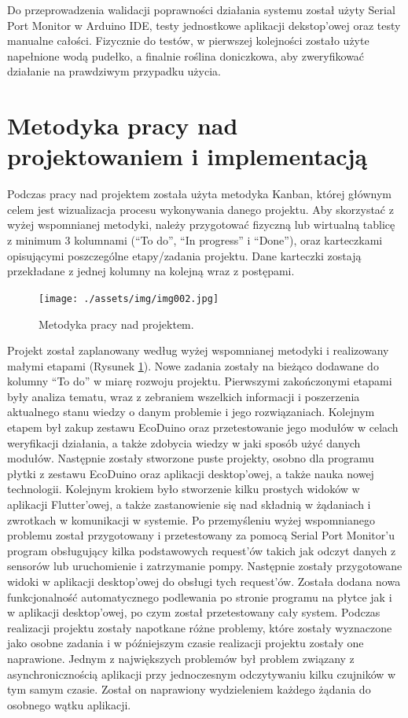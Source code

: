 \documentclass[a4paper,twoside,12pt]{book}
\begin{document}
Do przeprowadzenia walidacji poprawności działania systemu został użyty Serial Port Monitor w Arduino IDE, testy jednostkowe aplikacji dekstop'owej oraz testy manualne całości. Fizycznie do testów, w pierwszej kolejności zostało użyte napełnione wodą pudełko, a finalnie roślina doniczkowa, aby zweryfikować działanie na prawdziwym przypadku użycia.

\section{Metodyka pracy nad projektowaniem i implementacją}

Podczas pracy nad projektem została użyta metodyka Kanban, której głównym celem jest wizualizacja procesu wykonywania danego projektu. Aby skorzystać z wyżej wspomnianej metodyki, należy przygotować fizyczną lub wirtualną tablicę z minimum 3 kolumnami (``To do'', ``In progress'' i ``Done''), oraz karteczkami opisującymi poszczególne etapy/zadania projektu. Dane karteczki zostają przekładane z jednej kolumny na kolejną wraz z postępami.

\begin{figure}[H]
   \centering
   \texttt{[image: ./assets/img/img002.jpg]}
   \caption{Metodyka pracy nad projektem.}
   \label{fig:2}
\end{figure}

Projekt został zaplanowany według wyżej wspomnianej metodyki i realizowany małymi etapami (Rysunek \ref{fig:2}). Nowe zadania zostały na bieżąco dodawane do kolumny ``To do'' w miarę rozwoju projektu. Pierwszymi zakończonymi etapami były analiza tematu, wraz z zebraniem wszelkich informacji i poszerzenia aktualnego stanu wiedzy o danym problemie i jego rozwiązaniach. Kolejnym etapem był zakup zestawu EcoDuino oraz przetestowanie jego modułów w celach weryfikacji działania, a także zdobycia wiedzy w jaki sposób użyć danych modułów. Następnie zostały stworzone puste projekty, osobno dla programu płytki z zestawu EcoDuino oraz aplikacji desktop'owej, a także nauka nowej technologii. Kolejnym krokiem było stworzenie kilku prostych widoków w aplikacji Flutter'owej, a także zastanowienie się nad składnią w żądaniach i zwrotkach w komunikacji w systemie. Po przemyśleniu wyżej wspomnianego problemu został przygotowany i przetestowany za pomocą Serial Port Monitor'u program obsługujący kilka podstawowych request'ów takich jak odczyt danych z sensorów lub uruchomienie i zatrzymanie pompy. Następnie zostały przygotowane widoki w aplikacji desktop'owej do obsługi tych request'ów. Została dodana nowa funkcjonalność automatycznego podlewania po stronie programu na płytce jak i w aplikacji desktop'owej, po czym został przetestowany cały system. Podczas realizacji projektu zostały napotkane różne problemy, które zostały wyznaczone jako osobne zadania i w późniejszym czasie realizacji projektu zostały one naprawione. Jednym z największych problemów był problem związany z asynchronicznością aplikacji przy jednoczesnym odczytywaniu kilku czujników w tym samym czasie. Został on naprawiony wydzieleniem każdego żądania do osobnego wątku aplikacji.
\end{document}
